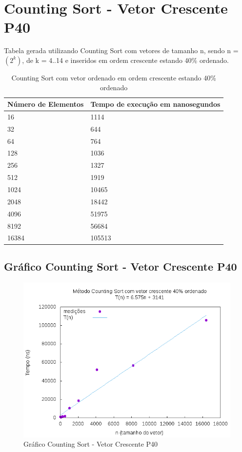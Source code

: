 \documentclass[12pt,a4paper,twoside]{report}
\begin{document}
\section{Counting Sort - Vetor Crescente P40}
Tabela gerada utilizando Counting Sort com vetores de tamanho n, sendo n = $(2^k)$, de k = 4..14 e inseridos em ordem crescente estando 40\% ordenado.
\begin{table}[H]
\centering
\caption{Counting Sort com vetor ordenado em ordem crescente estando 40\% ordenado}
\label{my-label}
\begin{tabular}{|l|l|}
\hline
\multicolumn{1}{|c|}{\textbf{Número de Elementos}} & \multicolumn{1}{c|}{\textbf{Tempo de execução em nanosegundos}} \\ \hline
16 & 1114 \\ \hline
32 & 644 \\ \hline
64 & 764 \\ \hline
128 & 1036 \\ \hline
256 & 1327 \\ \hline
512 & 1919 \\ \hline
1024 & 10465 \\ \hline
2048 & 18442 \\ \hline
4096 & 51975 \\ \hline
8192 & 56684 \\ \hline
16384 & 105513 \\ \hline
\end{tabular}
\end{table}

\subsection{Gráfico Counting Sort - Vetor Crescente P40}
\begin{figure}[H]
    \centering
    \includegraphics[width=0.7\linewidth]{graficos/CountingSort/vIntCrescenteP40/vIntCrescenteP40.png}
  \caption{Gráfico Counting Sort - Vetor Crescente P40}
\end{figure}
\end{document}
